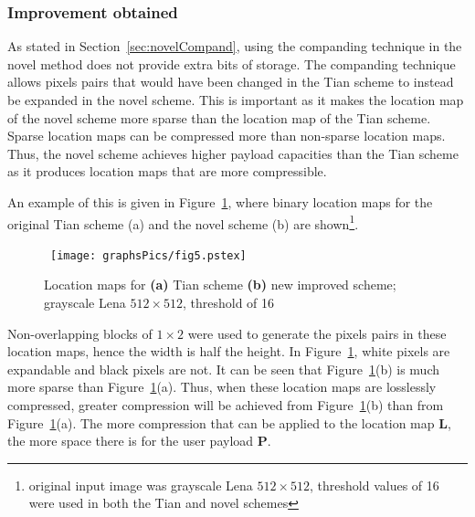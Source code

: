 \documentclass[10pt,twocolumn,letterpaper]{article}
\begin{document}
{\subsubsection{Improvement obtained}
\label{sec:improvements}
As stated in Section~\ref{sec:novelCompand}, using the companding technique in the novel method does not provide
extra bits of storage. The companding technique allows pixels pairs that would have been changed in
the Tian scheme to instead be expanded in the novel scheme.
This is important as it makes the location map of the novel scheme more sparse than the location map of the Tian scheme.
Sparse location maps can be compressed more than non-sparse location maps. Thus, the novel scheme achieves
higher payload capacities than the Tian scheme as it
produces location maps that are more compressible.

An example of this is given in 
Figure~\ref{fig:locmaps}, where binary location maps for the original Tian scheme (a) and the novel
scheme (b) are shown\footnote{original input image was grayscale Lena $512 \times 512$, threshold values of 16 were used in both
the Tian and novel schemes}. 
\begin{figure}[!htb]
\setlength{\abovecaptionskip}{-0.25cm}
\centerline{ \hbox{
        \texttt{[image: graphsPics/fig5.pstex]}
}}
        \caption{Location maps for {\bf (a)} Tian scheme {\bf (b)} new improved scheme; grayscale Lena $512\times 512$, threshold of 16}
        \label{fig:locmaps}
\setlength{\abovecaptionskip}{0cm}
\end{figure}
Non-overlapping blocks of $1\times 2$ were used to generate the pixels pairs in these location maps, hence
the width is half the height.
In Figure~\ref{fig:locmaps},
white pixels are expandable and black pixels are not. It can be seen that Figure~\ref{fig:locmaps}(b)
is much more sparse than Figure~\ref{fig:locmaps}(a). Thus, when these location maps are losslessly compressed,
greater compression will be achieved from Figure~\ref{fig:locmaps}(b) than from Figure~\ref{fig:locmaps}(a).
The more compression that can be applied to the location map {\bf L}, the more space there is for the user payload {\bf P}.

}
\end{document}
